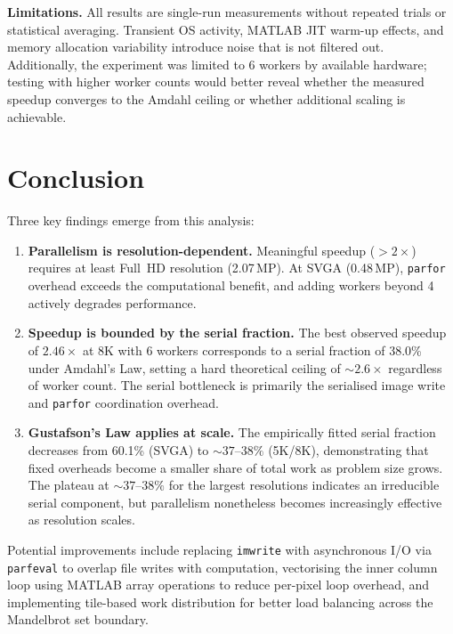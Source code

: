 \documentclass[conference]{IEEEtran}
\begin{document}
\textbf{Limitations.}
All results are single-run measurements without repeated trials or
statistical averaging.  Transient OS activity, MATLAB JIT warm-up effects,
and memory allocation variability introduce noise that is not filtered out.
Additionally, the experiment was limited to 6 workers by available hardware;
testing with higher worker counts would better reveal whether the measured
speedup converges to the Amdahl ceiling or whether additional scaling
is achievable.

\section{Conclusion}

Three key findings emerge from this analysis:

\begin{enumerate}
  \item \textbf{Parallelism is resolution-dependent.}  Meaningful speedup
        ($>2\times$) requires at least Full~HD resolution (2.07\,MP).  At
        SVGA (0.48\,MP), \texttt{parfor} overhead exceeds the computational
        benefit, and adding workers beyond 4 actively degrades performance.

  \item \textbf{Speedup is bounded by the serial fraction.}  The best
        observed speedup of $2.46\times$ at 8K with 6 workers corresponds
        to a serial fraction of 38.0\% under Amdahl's Law, setting a
        hard theoretical ceiling of ${\sim}2.6\times$ regardless of worker
        count.  The serial bottleneck is primarily the serialised image
        write and \texttt{parfor} coordination overhead.

  \item \textbf{Gustafson's Law applies at scale.}  The empirically fitted
        serial fraction decreases from 60.1\% (SVGA) to ${\sim}37\text{--}38\%$
        (5K/8K), demonstrating that fixed overheads become a smaller share
        of total work as problem size grows.  The plateau at
        ${\sim}37\text{--}38\%$ for the largest resolutions indicates an
        irreducible serial component, but parallelism nonetheless becomes
        increasingly effective as resolution scales.
\end{enumerate}

Potential improvements include replacing \texttt{imwrite} with asynchronous
I/O via \texttt{parfeval} to overlap file writes with computation,
vectorising the inner column loop using MATLAB array operations to reduce
per-pixel loop overhead, and implementing tile-based work distribution for
better load balancing across the Mandelbrot set boundary.
\end{document}
